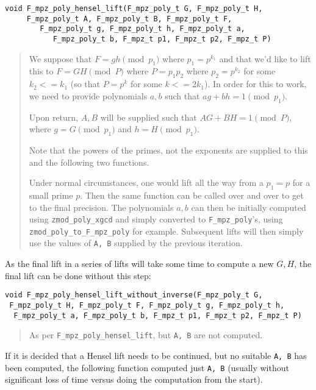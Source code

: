 \documentclass[a4paper,10pt]{article}
\newcommand{\code}{\lstinline}
\begin{document}
\begin{lstlisting}
void F_mpz_poly_hensel_lift(F_mpz_poly_t G, F_mpz_poly_t H, 
     F_mpz_poly_t A, F_mpz_poly_t B, F_mpz_poly_t F, 
        F_mpz_poly_t g, F_mpz_poly_t h, F_mpz_poly_t a, 
           F_mpz_poly_t b, F_mpz_t p1, F_mpz_t p2, F_mpz_t P)
\end{lstlisting}
\begin{quote}
We suppose that $F = gh \pmod{p_1}$ where $p_1 = p^{k_1}$ and that we'd like to lift this to 
$F = GH \pmod{P}$ where $P = p_1p_2$ where $p_2 = p^{k_2}$ for some $k_2 <= k_1$ (so that $P = p^k$
for some $k <= 2k_1$). In order for this to work, we need to provide polynomials $a, b$ such that
$ag + bh = 1 \pmod{p_1}$. 

Upon return, $A, B$ will be supplied such that $AG + BH = 1 \pmod{P}$, where $g = G \pmod{p_1}$ 
and $h = H \pmod{p_1}$. 

Note that the powers of the primes, not the exponents are supplied to this and the following two 
functions.

Under normal circumstances, one would lift all the way from a $p_1 = p$ for a small prime $p$. Then
the same function can be called over and over to get to the final precision. The polynomials $a, b$
can then be initially computed using \code{zmod_poly_xgcd} and simply converted to \code{F_mpz_poly}'s,
using \code{zmod_poly_to_F_mpz_poly} for example. Subsequent lifts will then simply use the values
of \code{A, B} supplied by the previous iteration. 
\end{quote}

As the final lift in a series of lifts will take some time to compute a new $G, H$, the final lift 
can be done without this step:

\begin{lstlisting}
void F_mpz_poly_hensel_lift_without_inverse(F_mpz_poly_t G, 
 F_mpz_poly_t H, F_mpz_poly_t F, F_mpz_poly_t g, F_mpz_poly_t h, 
  F_mpz_poly_t a, F_mpz_poly_t b, F_mpz_t p1, F_mpz_t p2, F_mpz_t P)
\end{lstlisting}
\begin{quote}
As per \code{F_mpz_poly_hensel_lift}, but \code{A, B} are not computed.
\end{quote}

If it is decided that a Hensel lift needs to be continued, but no suitable \code{A, B} has been 
computed, the following function computed just \code{A, B} (usually without significant loss of
time versus doing the computation from the start).
\end{document}
